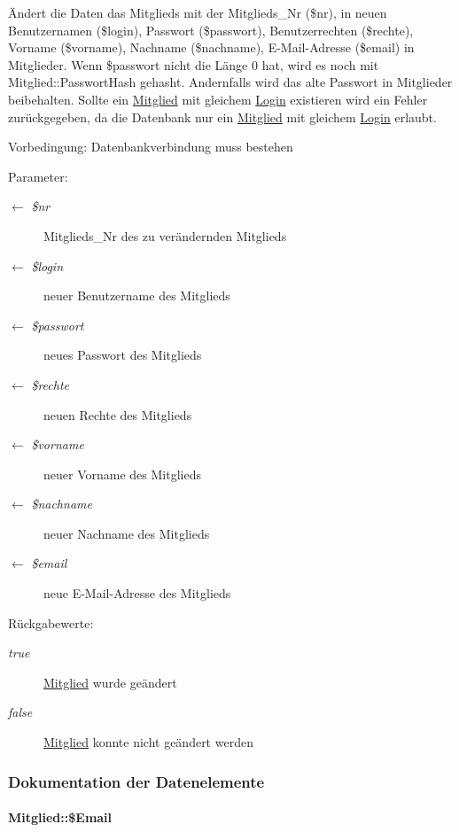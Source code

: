Ändert die Daten das Mitglieds mit der Mitglieds\_\-Nr (\$nr), in neuen Benutzernamen (\$login), Passwort (\$passwort), Benutzerrechten (\$rechte), Vorname (\$vorname), Nachname (\$nachname), E-Mail-Adresse (\$email) in Mitglieder. Wenn \$passwort nicht die Länge 0 hat, wird es noch mit Mitglied::Passwort\-Hash gehasht. Andernfalls wird das alte Passwort in Mitglieder beibehalten. Sollte ein \hyperlink{classMitglied}{Mitglied} mit gleichem \hyperlink{classLogin}{Login} existieren wird ein Fehler zurückgegeben, da die Datenbank nur ein \hyperlink{classMitglied}{Mitglied} mit gleichem \hyperlink{classLogin}{Login} erlaubt. \begin{Desc}
\item[Vorbedingung:]Datenbankverbindung muss bestehen \end{Desc}
\begin{Desc}
\item[Parameter:]
\begin{description}
\item[\mbox{$\leftarrow$} {\em \$nr}]Mitglieds\_\-Nr des zu verändernden Mitglieds \item[\mbox{$\leftarrow$} {\em \$login}]neuer Benutzername des Mitglieds \item[\mbox{$\leftarrow$} {\em \$passwort}]neues Passwort des Mitglieds \item[\mbox{$\leftarrow$} {\em \$rechte}]neuen Rechte des Mitglieds \item[\mbox{$\leftarrow$} {\em \$vorname}]neuer Vorname des Mitglieds \item[\mbox{$\leftarrow$} {\em \$nachname}]neuer Nachname des Mitglieds \item[\mbox{$\leftarrow$} {\em \$email}]neue E-Mail-Adresse des Mitglieds \end{description}
\end{Desc}
\begin{Desc}
\item[R\"{u}ckgabewerte:]
\begin{description}
\item[{\em true}]\hyperlink{classMitglied}{Mitglied} wurde geändert \item[{\em false}]\hyperlink{classMitglied}{Mitglied} konnte nicht geändert werden\end{description}
\end{Desc}


\subsubsection{Dokumentation der Datenelemente}
\hypertarget{classMitglied_4be6b837c482ac912188663380d31122}{
\paragraph[\$Email]{\setlength{\rightskip}{0pt plus 5cm}Mitglied::\$Email}\hfill}
\label{classMitglied_4be6b837c482ac912188663380d31122}


